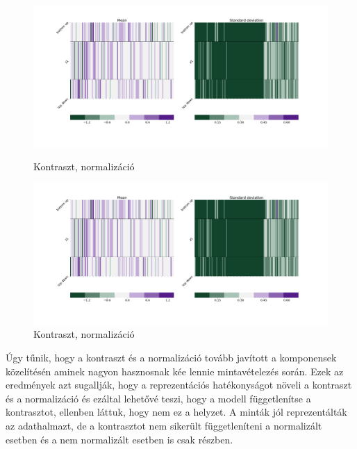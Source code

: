 \documentclass[12pt, english]{article}
\begin{document}
\begin{figure}[H]
  \begin{minipage}{0.5\linewidth}
    \centering
    \includegraphics[width=.75\linewidth]{z1_vis/z1_vis_norm_contrast/16_DenseLinLinLadderVAE_textures_contrastNorm_contrast-stats-1_vector_comparisons_1.png}
    \caption{Kontraszt, normalizáció}
    \label{fig:sample-norm-contrast-1}
  \end{minipage}
  \begin{minipage}{0.5\linewidth}
    \centering
    \includegraphics[width=.75\linewidth]{z1_vis/z1_vis_norm_contrast/16_DenseLinLinLadderVAE_textures_contrastNorm_contrast-stats-1_vector_comparisons_1.png}
    \caption{Kontraszt, normalizáció}
    \label{fig:sample-norm-contrast-2}
  \end{minipage}
\end{figure}

\vspace{4mm}

\par Úgy tűnik, hogy a kontraszt és a normalizáció tovább javított a komponensek közelítésén aminek nagyon hasznosnak kée lennie mintavételezés során. Ezek az eredmények azt sugallják, hogy a reprezentációs hatékonyságot növeli a kontraszt és a normalizáció és ezáltal lehetővé teszi, hogy a modell függetlenítse a kontrasztot, ellenben láttuk, hogy nem ez a helyzet. A minták jól reprezentálták az adathalmazt, de a kontrasztot nem sikerült függetleníteni a normalizált esetben és a nem normalizált esetben is csak részben.

\vspace{4mm}
\end{document}
